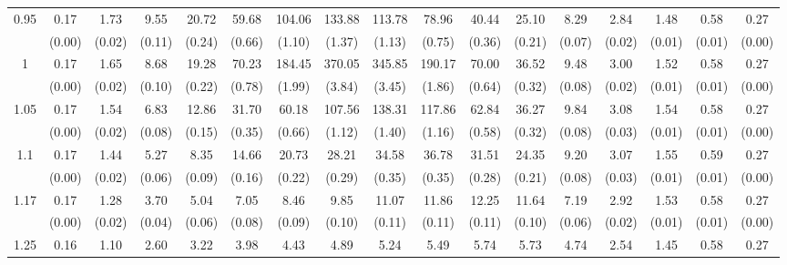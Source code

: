 \documentclass[12pt]{article}  %
\theoremstyle{plain}
\begin{document}
\begin{sidewaystable}[htbp]
\begin{tabular}{ccccccccccccccccc}
\multirow{2}{*}{0.95}  &0.17& 1.73 &9.55 &20.72 &59.68 &104.06& 133.88 &113.78  &78.96 &40.44 &25.10 & 8.29 & 2.84 & 1.48 & 0.58 & 0.27\\                
					  & (0.00)& (0.02)& (0.11)& (0.24)& (0.66)& (1.10)& (1.37)& (1.13)& (0.75)&  (0.36)&  (0.21)&  (0.07)&  (0.02)&  (0.01)&  (0.01)& (0.00)\\ \hline
\multirow{2}{*}{1}  & 0.17& 1.65& 8.68 &19.28 &70.23 &184.45& 370.05& 345.85 &190.17& 70.00 &36.52 & 9.48 & 3.00 & 1.52 & 0.58 & 0.27\\
                      & (0.00)& (0.02)& (0.10)& (0.22)& (0.78)& (1.99)& (3.84)& (3.45)& (1.86)&  (0.64)&  (0.32)&  (0.08)&  (0.02)&  (0.01)&  (0.01)& (0.00)\\ \hline                                                                     
\multirow{2}{*}{1.05}  & 0.17 &1.54 &6.83 &12.86& 31.70 & 60.18& 107.56& 138.31& 117.86 &62.84 &36.27 & 9.84 & 3.08 & 1.54 & 0.58 & 0.27\\
                      & (0.00)&   (0.02)& (0.08)& (0.15)& (0.35)& (0.66)& (1.12)& (1.40)& (1.16)&  (0.58)&  (0.32)&  (0.08)&  (0.03)&  (0.01)&  (0.01)& (0.00)\\ \hline                                                                                                                                          
\multirow{2}{*}{1.1}  &0.17& 1.44 &5.27 & 8.35& 14.66 & 20.73 & 28.21&  34.58 & 36.78 &31.51 &24.35 & 9.20 & 3.07 &1.55 & 0.59 & 0.27\\
                      &  (0.00)&   (0.02)& (0.06)& (0.09)& (0.16)& (0.22)& (0.29)& (0.35)& (0.35)&  (0.28)&  (0.21)&  (0.08)&  (0.03)&  (0.01)&  (0.01)& (0.00)\\ \hline
\multirow{2}{*}{1.17}  & 0.17 &1.28& 3.70&  5.04 & 7.05  & 8.46  & 9.85 & 11.07 & 11.86 &12.25 &11.64 & 7.19 & 2.92 & 1.53 & 0.58 & 0.27\\
                      & (0.00)&   (0.02)& (0.04)& (0.06)& (0.08)& (0.09)& (0.10)& (0.11)& (0.11)&  (0.11)&  (0.10)&  (0.06)&  (0.02)&  (0.01)&  (0.01)& (0.00)\\ \hline                                                                                                                                                                                                                                                                                    
                                                                     \multirow{2}{*}{1.25}  &0.16 &1.10 &2.60  &3.22 & 3.98  & 4.43  & 4.89 &  5.24  & 5.49 & 5.74 & 5.73 & 4.74&  2.54 & 1.45 & 0.58 & 0.27\\

\end{tabular}
\end{sidewaystable}
\end{document}
